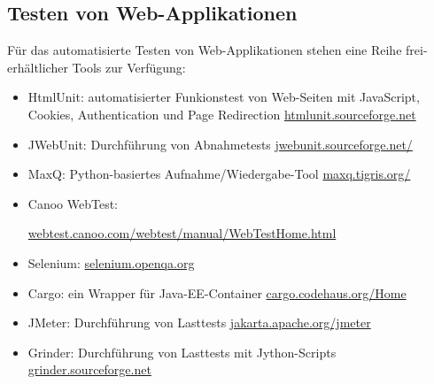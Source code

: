 \subsection{Testen von Web-Applikationen}
%
Für das automatisierte Testen von Web-Applikationen
stehen eine Reihe frei-erhältlicher Tools zur Verfügung:
\begin{itemize}
\item HtmlUnit: automatisierter Funkionstest von Web-Seiten mit JavaScript,
  Cookies, Authentication und Page Redirection
\href{http://htmlunit.sourceforge.net/}{htmlunit.sourceforge.net}
\item JWebUnit: Durchführung von Abnahmetests
\href{http://jwebunit.sourceforge.net/}{jwebunit.sourceforge.net/}
\item MaxQ: Python-basiertes Aufnahme/Wiedergabe-Tool
\href{http://maxq.tigris.org/}{maxq.tigris.org/}
\item Canoo WebTest:

\href{http://webtest.canoo.com/webtest/manual/WebTestHome.html}
{webtest.canoo.com/webtest/manual/WebTestHome.html}
\item Selenium:
\href{http://selenium.openqa.org}{selenium.openqa.org}
\item Cargo: ein Wrapper für Java-EE-Container
 \href{http://cargo.codehaus.org/Home}{cargo.codehaus.org/Home}
\item JMeter: Durchführung von Lasttests
\href{http://jakarta.apache.org/jmeter}{jakarta.apache.org/jmeter}
\item Grinder: Durchführung von Lasttests mit Jython-Scripts
  \href{http://grinder.sourceforge.net}{grinder.sourceforge.net}
\end{itemize}
\newslide

\newslide

\newslide

\newslide

